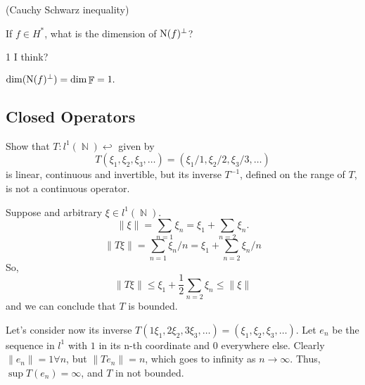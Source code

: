 \documentclass{article}
\theoremstyle{remark}
\newenvironment{exercise}[1]
  {\renewcommand\theinnerex{#1}\innerex}
  {\endinnerex}
\newcommand{\norm}[1]{\lVert #1 \rVert}
\DeclareMathOperator{\Natural}{\mathbb{N}}
\DeclareMathOperator{\field}{\mathbb{F}}
\begin{document}
\begin{exercise}{1.1.39} (Cauchy Schwarz inequality)

\end{exercise}

\begin{exercise}{1.1.42}
    If $f \in H^*$, what is the dimension of $\operatorname{N}(f)^\perp$?

    1 I think?

    $\dim (\kernel(f)^\perp )= \dim \field = 1.$

\end{exercise}

\subsection{Closed Operators}


\begin{exercise}{1.2.3}
    Show that $T : l^1 (\Natural) \hookleftarrow$ given by $$T (\xi_1, \xi_2, \xi_3, \dots ) = (\xi_1 /1, \xi_2 /2,\xi_3 /3, \dots )$$
    is linear, continuous and invertible, but its inverse $T^{-1}$, defined on the
    range of $T$, is not a continuous operator.


    Suppose and arbitrary $\xi \in l^1(\Natural)$.
    $$\norm{\xi} = \sum_{n=1} \xi_n = \xi_1 + \sum_{n=2} \xi_n.$$
    $$ \norm{T\xi} = \sum_{n=1} \xi_n/n = \xi_1 + \sum_{n=2} \xi_n/n $$
    So,
    $$ \norm{T\xi} \leq \xi_1 + \frac{1}{2} \sum_{n=2} \xi_n \leq \norm{\xi}$$
    and we can conclude that $T$ is bounded.

    Let's consider now its inverse $ T(1\xi_1, 2\xi_2, 3\xi_3, \dots) = (\xi_1, \xi_2,\xi_3, \dots)$. Let $e_n$ be the sequence in $l^1$ with $1$ in its n-th coordinate and
    $0$ everywhere else. Clearly $\norm{e_n} = 1 \forall n$, but $\norm{Te_n} = n$, which goes to infinity as $n\to\infty$. Thus, $\sup T(e_n) = \infty$, and $T$ in not bounded.

\end{exercise}
\end{document}
